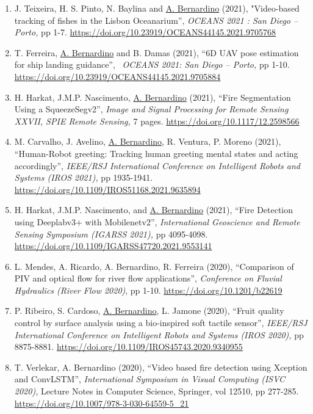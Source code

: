 \documentclass[
]{article}
\begin{document}
\begin{enumerate}
  \emph{IEEE Intelligent Vehicles Symposium (IEEE IV 2021),} pp 797-803.
  \url{https://doi.org/10.1109/IV48863.2021.9576034}~
\item
  J. Teixeira, H. S. Pinto, N. Baylina and \ul{A. Bernardino} (2021),
  "Video-based tracking of fishes in the Lisbon Oceanarium'',
  \emph{OCEANS 2021 : San Diego -- Porto,} pp 1-7.
  \url{https://doi.org/10.23919/OCEANS44145.2021.9705768}~
\item
  T. Ferreira, \ul{A. Bernardino} and B. Damas (2021), ``6D UAV pose
  estimation for ship landing guidance'',~ \emph{OCEANS 2021: San Diego
  -- Porto,} pp 1-10.
  \url{https://doi.org/10.23919/OCEANS44145.2021.9705884}~
\item
  H. Harkat, J.M.P. Nascimento, \ul{A. Bernardino} (2021), ``Fire
  Segmentation Using a SqueezeSegv2'', \emph{Image and Signal Processing
  for Remote Sensing XXVII, SPIE Remote Sensing,} 7 pages.
  \url{https://doi.org/10.1117/12.2598566}~
\item
  M. Carvalho, J. Avelino, \ul{A. Bernardino}, R. Ventura, P. Moreno
  (2021), ``Human-Robot greeting: Tracking human greeting mental states
  and acting accordingly'', \emph{IEEE/RSJ International Conference on
  Intelligent Robots and Systems (IROS 2021),} pp 1935-1941.
  \url{https://doi.org/10.1109/IROS51168.2021.9635894}~
\item
  H. Harkat, J.M.P. Nascimento, and \ul{A. Bernardino} (2021), ``Fire
  Detection using Deeplabv3+ with Mobilenetv2'', \emph{International
  Geoscience and Remote Sensing Symposium (IGARSS 2021),} pp 4095-4098.
  \url{https://doi.org/10.1109/IGARSS47720.2021.9553141}~
\item
  L. Mendes, A. Ricardo, A. Bernardino, R. Ferreira (2020), ``Comparison
  of PIV and optical flow for river flow applications'',
  \emph{Conference on Fluvial Hydraulics (River Flow 2020)}, pp 1-10.
  \url{https://doi.org/10.1201/b22619}
\item
  P. Ribeiro, S. Cardoso, \ul{A. Bernardino}, L. Jamone (2020), ``Fruit
  quality control by surface analysis using a bio-inspired soft tactile
  sensor'', \emph{IEEE/RSJ International Conference on Intelligent
  Robots and Systems (IROS 2020),} pp 8875-8881.
  \url{https://doi.org/10.1109/IROS45743.2020.9340955}~~~
\item
  T. Verlekar, A. Bernardino (2020), ``Video based fire detection using
  Xception and ConvLSTM'', \emph{International Symposium in Visual
  Computing (ISVC 2020),} Lecture Notes in Computer Science, Springer,
  vol 12510, pp 277-285.
  \url{https://doi.org/10.1007/978-3-030-64559-5_21}~~

\end{enumerate}
\end{document}
